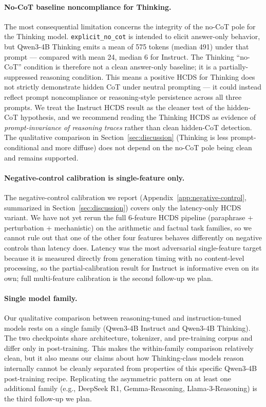 \documentclass{article}
\theoremstyle{plain}
\theoremstyle{definition}
\theoremstyle{remark}
\begin{document}
\paragraph{No-CoT baseline noncompliance for Thinking.}
The most consequential limitation concerns the integrity of the no-CoT pole for the Thinking model. \texttt{explicit\_no\_cot} is intended to elicit answer-only behavior, but Qwen3-4B Thinking emits a mean of 575 tokens (median 491) under that prompt --- compared with mean 24, median 6 for Instruct. The Thinking ``no-CoT'' condition is therefore not a clean answer-only baseline; it is a partially-suppressed reasoning condition. This means a positive HCDS for Thinking does not strictly demonstrate hidden CoT under neutral prompting --- it could instead reflect prompt noncompliance or reasoning-style persistence across all three prompts. We treat the Instruct HCDS result as the cleaner test of the hidden-CoT hypothesis, and we recommend reading the Thinking HCDS as evidence of \emph{prompt-invariance of reasoning traces} rather than clean hidden-CoT detection. The qualitative comparison in Section~\ref{sec:discussion} (Thinking is less prompt-conditional and more diffuse) does not depend on the no-CoT pole being clean and remains supported.

\paragraph{Negative-control calibration is single-feature only.}
The negative-control calibration we report (Appendix~\ref{app:negative-control}, summarized in Section~\ref{sec:discussion}) covers only the latency-only HCDS variant. We have not yet rerun the full 6-feature HCDS pipeline (paraphrase + perturbation + mechanistic) on the arithmetic and factual task families, so we cannot rule out that one of the other four features behaves differently on negative controls than latency does. Latency was the most adversarial single-feature target because it is measured directly from generation timing with no content-level processing, so the partial-calibration result for Instruct is informative even on its own; full multi-feature calibration is the second follow-up we plan.

\paragraph{Single model family.}
Our qualitative comparison between reasoning-tuned and instruction-tuned models rests on a single family (Qwen3-4B Instruct and Qwen3-4B Thinking). The two checkpoints share architecture, tokenizer, and pre-training corpus and differ only in post-training. This makes the within-family comparison relatively clean, but it also means our claims about how Thinking-class models reason internally cannot be cleanly separated from properties of this specific Qwen3-4B post-training recipe. Replicating the asymmetric pattern on at least one additional family (e.g., DeepSeek R1, Gemma-Reasoning, Llama-3-Reasoning) is the third follow-up we plan.
\end{document}

